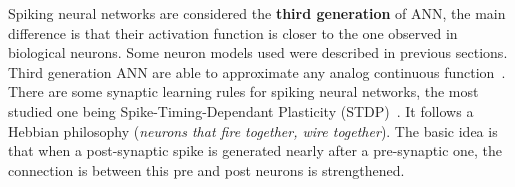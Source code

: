 Spiking neural networks are considered the \textbf{third generation} of ANN, the main difference is that their activation function is closer to the one observed in biological neurons. Some neuron models used were described in previous sections. Third generation ANN are able to approximate any analog continuous function~\cite{third-gen-nn-Maass1997}. 
There are some synaptic learning rules for spiking neural networks, the most studied one being Spike-Timing-Dependant Plasticity (STDP)~\cite{STDP-Song2000}. 
It follows a Hebbian philosophy (\emph{neurons that fire together, wire together}). The basic idea is that when a post-synaptic spike is generated nearly after a pre-synaptic one, the connection is between this pre and post neurons is strengthened.\\

